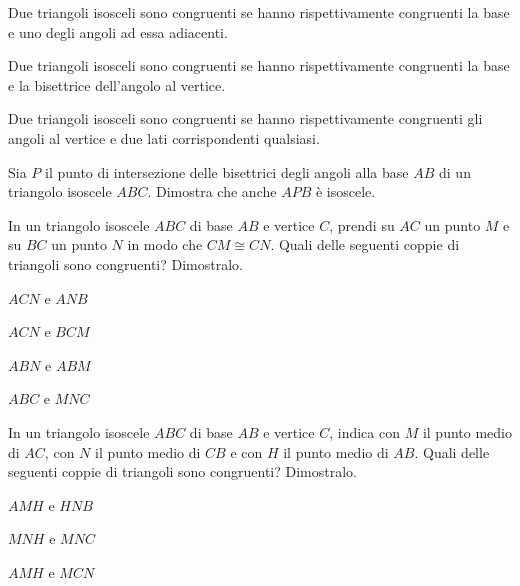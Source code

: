 \begin{multicols}{2}
\begin{esercizio}
\label{ese:2.31}
Due triangoli isosceli sono congruenti se hanno rispettivamente 
congruenti la base e uno degli angoli ad essa adiacenti.
\end{esercizio}

\begin{esercizio}
\label{ese:2.32}
Due triangoli isosceli sono congruenti se hanno rispettivamente 
congruenti la base e la bisettrice dell'angolo al vertice.
\end{esercizio}

\begin{esercizio}
\label{ese:2.33}
Due triangoli isosceli sono congruenti se hanno rispettivamente 
congruenti gli angoli al vertice e due lati corrispondenti qualsiasi.
\end{esercizio}

\begin{esercizio}
\label{ese:2.34}
Sia \(P\) il punto di intersezione delle bisettrici degli angoli alla 
base \(AB\) di un triangolo isoscele \(ABC\). Dimostra che anche \(APB\) è 
isoscele.
\end{esercizio}

\begin{esercizio}
\label{ese:2.35}
In un triangolo isoscele \(ABC\) di base \(AB\) e vertice \(C\), prendi su 
\(AC\) un punto \(M\) e su \(BC\) un punto \(N\) in modo che \(CM\cong CN\). 
Quali delle seguenti coppie di triangoli sono congruenti? Dimostralo.
\begin{multicols}{2}
\begin{enumeratea}
\item \(ACN\) e \(ANB\)
\item \(ACN\) e \(BCM\)
\item \(ABN\) e \(ABM\)
\item \(ABC\) e \(MNC\)
\end{enumeratea}
\end{multicols}
\end{esercizio}

\begin{esercizio}
\label{ese:2.36}
In un triangolo isoscele \(ABC\) di base \(AB\) e vertice \(C\), indica con 
\(M\) il punto medio di \(AC\), con \(N\) il punto medio di \(CB\) e con \(H\) 
il punto medio di \(AB\). Quali delle seguenti coppie di triangoli sono 
congruenti? Dimostralo.
\begin{multicols}{2}
\begin{enumeratea}
\item \(AMH\) e \(HNB\)
\item \(MNH\) e \(MNC\)
\item \(AMH\) e \(MCN\)
\end{enumeratea}
\end{multicols}
\end{esercizio}


\end{multicols}
